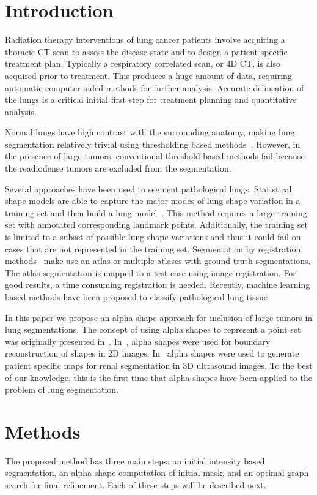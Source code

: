 \documentclass{llncs}
\begin{document}
\section{Introduction}
%
Radiation therapy interventions of lung cancer patients involve acquiring a thoracic CT scan to assess the disease state and to design a patient specific treatment plan. Typically a respiratory correlated scan, or 4D CT, is also acquired prior to treatment. This produces a huge amount of data, requiring automatic computer-aided methods for further analysis. Accurate delineation of the lungs is a critical initial first step for treatment planning and quantitative analysis.

Normal lungs have high contrast with the surrounding anatomy, making lung segmentation relatively trivial using thresholding based methods~\cite{guo2008,hu2001}. However, in the presence of large tumors, conventional threshold based methods fail because the readiodense tumors are excluded from the segmentation. 

Several approaches have been used to segment pathological lungs. Statistical shape models are able to capture the major modes of lung shape variation in a training set and then build a lung model~\cite{sofka2011,sun2012}. This method requires a large training set with annotated corresponding landmark points. Additionally, the training set is limited to a subset of possible lung shape variations and thus it could fail on cases that are not represented in the training set. Segmentation by registration methods~\cite{sluimer2005,vanrikxoort2009} make use an atlas or multiple atlases with ground truth segmentations. The atlas segmentation is mapped to a test case using image registration. For good results, a time consuming registration is needed. Recently, machine learning based methods have been proposed to classify pathological lung tissue~\cite{mansoor2014,song2012}

In this paper we propose an alpha shape approach for inclusion of large tumors in lung segmentations. The concept of using alpha shapes to represent a point set was originally presented in~\cite{edelsbrunner1983}. In~\cite{stelldinger2006}, alpha shapes were used for boundary reconstruction of shapes in 2D images. In~\cite{cerrolaza2015} alpha shapes were used to generate patient specific maps for renal segmentation in 3D ultrasound images. To the best of our knowledge, this is the first time that alpha shapes have been applied to the problem of lung segmentation. 


%
\section{Methods}
%
The proposed method has three main steps: an initial intensity based segmentation, an alpha shape computation of initial mask, and an optimal graph search for final refinement. Each of these steps will be described next.
%
\end{document}
